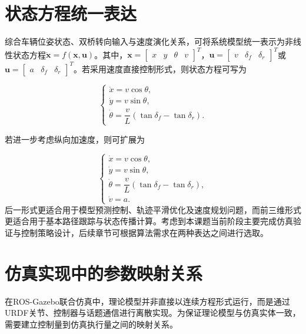 \section{状态方程统一表达}

综合车辆位姿状态、双桥转向输入与速度演化关系，可将系统模型统一表示为非线性状态方程\(\dot{\mathbf{x}} = f(\mathbf{x},\mathbf{u})\)。其中，\(\mathbf{x} = \begin{bmatrix}
x & y & \theta & v
\end{bmatrix}^{T}\)，\(\mathbf{u} = \begin{bmatrix}
v & \delta_{f} & \delta_{r}
\end{bmatrix}^{T}\)或\(\mathbf{u} = \begin{bmatrix}
a & \delta_{f} & \delta_{r}
\end{bmatrix}^{T}\)。若采用速度直接控制形式，则状态方程可写为

\begin{equation}
\begin{cases}
\dot{x}=v\cos\theta,\\
\dot{y}=v\sin\theta,\\
\dot{\theta}=\dfrac{v}{L}\left(\tan\delta_f-\tan\delta_r\right).
\end{cases}
\label{eq:state_velocity}
\end{equation}

若进一步考虑纵向加速度，则可扩展为

\begin{equation}
\begin{cases}
\dot{x}=v\cos\theta,\\
\dot{y}=v\sin\theta,\\
\dot{\theta}=\dfrac{v}{L}\left(\tan\delta_f-\tan\delta_r\right),\\
\dot{v}=a.
\end{cases}
\label{eq:state_acceleration}
\end{equation}
后一形式更适合用于模型预测控制、轨迹平滑优化及速度规划问题，而前三维形式更适合用于基本路径跟踪与状态传播计算。考虑到本课题当前阶段主要完成仿真验证与控制策略设计，后续章节可根据算法需求在两种表达之间进行选取。

\section{仿真实现中的参数映射关系}

在ROS-Gazebo联合仿真中，理论模型并非直接以连续方程形式运行，而是通过URDF关节、控制器与话题通信进行离散实现\cite{ref11,ref12,ref13,ref14,ref15,ref16}。为保证理论模型与仿真实体一致，需要建立控制量到仿真执行量之间的映射关系。

